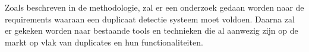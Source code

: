 
\chapter{}%
\label{ch:Onderzoek}

Zoals beschreven in de methodologie, zal er een onderzoek gedaan worden naar de requirements waaraan een duplicaat detectie systeem moet voldoen. Daarna zal er gekeken worden naar bestaande tools en technieken die al aanwezig zijn op de markt op vlak van duplicates en hun functionaliteiten. 

\section{}%
\label{sec:requirementsanalyse}

